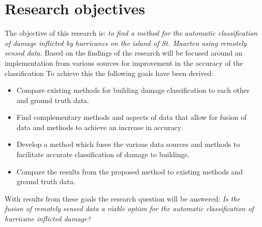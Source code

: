 \chapter{Research objectives} \label{research}

The objective of this research is: \textit{to find a method for the automatic classification of damage inflicted by hurricanes on the island of St. Maarten using remotely sensed data.} Based on the findings of \citet{Kakooei2017} the research will be focused around an implementation from various sources for improvement in the accuracy of the classification To achieve this the following goals have been derived:

\begin{itemize}
	\item Compare existing methods for building damage classification to each other and ground truth data.
	\item Find complementary methods and aspects of data that allow for fusion of data and methods to achieve an increase in accuracy.
	\item Develop a method which fuses the various data sources and methods to facilitate accurate classification of damage to buildings. 
	\item Compare the results from the proposed method to existing methods and ground truth data.
\end{itemize}

With results from these goals the research question will be answered: \textit{Is the fusion of remotely sensed data a viable option for the automatic classification of hurricane inflicted damage?}\\


